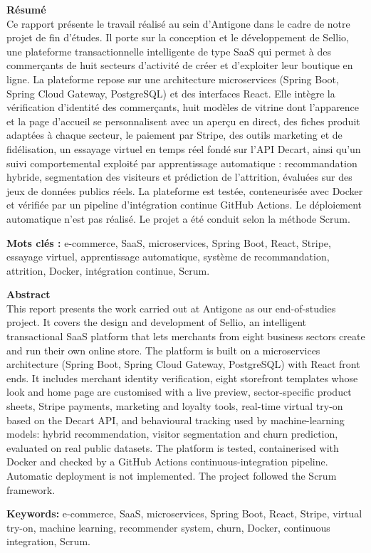 \clearpage
\thispagestyle{empty}
\noindent\textbf{\large Résumé}\\[0.3cm]
Ce rapport présente le travail réalisé au sein d'Antigone dans le cadre de notre projet de fin d'études. Il porte sur la conception et le développement de Sellio, une plateforme transactionnelle intelligente de type SaaS qui permet à des commerçants de huit secteurs d'activité de créer et d'exploiter leur boutique en ligne. La plateforme repose sur une architecture microservices (Spring Boot, Spring Cloud Gateway, PostgreSQL) et des interfaces React. Elle intègre la vérification d'identité des commerçants, huit modèles de vitrine dont l'apparence et la page d'accueil se personnalisent avec un aperçu en direct, des fiches produit adaptées à chaque secteur, le paiement par Stripe, des outils marketing et de fidélisation, un essayage virtuel en temps réel fondé sur l'API Decart, ainsi qu'un suivi comportemental exploité par apprentissage automatique : recommandation hybride, segmentation des visiteurs et prédiction de l'attrition, évaluées sur des jeux de données publics réels. La plateforme est testée, conteneurisée avec Docker et vérifiée par un pipeline d'intégration continue GitHub Actions. Le déploiement automatique n'est pas réalisé. Le projet a été conduit selon la méthode Scrum.

\vspace{0.3cm}
\noindent\textbf{Mots clés :} e-commerce, SaaS, microservices, Spring Boot, React, Stripe, essayage virtuel, apprentissage automatique, système de recommandation, attrition, Docker, intégration continue, Scrum.

\vspace{1.2cm}
\noindent\textbf{\large Abstract}\\[0.3cm]
This report presents the work carried out at Antigone as our end-of-studies project. It covers the design and development of Sellio, an intelligent transactional SaaS platform that lets merchants from eight business sectors create and run their own online store. The platform is built on a microservices architecture (Spring Boot, Spring Cloud Gateway, PostgreSQL) with React front ends. It includes merchant identity verification, eight storefront templates whose look and home page are customised with a live preview, sector-specific product sheets, Stripe payments, marketing and loyalty tools, real-time virtual try-on based on the Decart API, and behavioural tracking used by machine-learning models: hybrid recommendation, visitor segmentation and churn prediction, evaluated on real public datasets. The platform is tested, containerised with Docker and checked by a GitHub Actions continuous-integration pipeline. Automatic deployment is not implemented. The project followed the Scrum framework.

\vspace{0.3cm}
\noindent\textbf{Keywords:} e-commerce, SaaS, microservices, Spring Boot, React, Stripe, virtual try-on, machine learning, recommender system, churn, Docker, continuous integration, Scrum.
